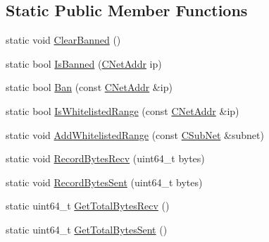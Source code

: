 \subsection*{Static Public Member Functions}
\begin{DoxyCompactItemize}
\item 
static void \hyperlink{class_c_node_ad75b43ab81213b74446163211c24246a}{Clear\+Banned} ()
\item 
static bool \hyperlink{class_c_node_aefa8b81afa53b4c6635dc4c6c024211a}{Is\+Banned} (\hyperlink{class_c_net_addr}{C\+Net\+Addr} ip)
\item 
static bool \hyperlink{class_c_node_a7d5dd8d7531bfbe069092be583569956}{Ban} (const \hyperlink{class_c_net_addr}{C\+Net\+Addr} \&ip)
\item 
static bool \hyperlink{class_c_node_ad2ccd5d22994f338c9b55ebe7528ea55}{Is\+Whitelisted\+Range} (const \hyperlink{class_c_net_addr}{C\+Net\+Addr} \&ip)
\item 
static void \hyperlink{class_c_node_ad2c1f955ec23851bd87a6bb144d85d03}{Add\+Whitelisted\+Range} (const \hyperlink{class_c_sub_net}{C\+Sub\+Net} \&subnet)
\item 
static void \hyperlink{class_c_node_af72b4b6e454c743af071896019ae1c69}{Record\+Bytes\+Recv} (uint64\+\_\+t bytes)
\item 
static void \hyperlink{class_c_node_a945c993a84eaa9d6bca18284befaccbe}{Record\+Bytes\+Sent} (uint64\+\_\+t bytes)
\item 
static uint64\+\_\+t \hyperlink{class_c_node_a1988b63b48fdc9b72014bdf9588b0168}{Get\+Total\+Bytes\+Recv} ()
\item 
static uint64\+\_\+t \hyperlink{class_c_node_af318a64e7ddad50d1e1b6fc123a5f0b9}{Get\+Total\+Bytes\+Sent} ()
\end{DoxyCompactItemize}
